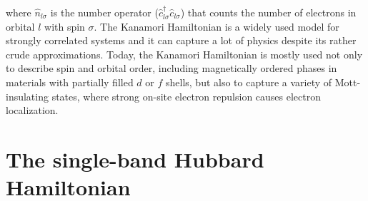 \documentclass[../../main.tex]{subfiles}
\begin{document}
where $\hat n_{l\sigma}$ is the number operator ($\hat c^\dagger_{l\sigma}\hat c_{l\sigma}$) that counts the number of electrons in orbital $l$ with spin $\sigma$. The Kanamori Hamiltonian is a widely used model for strongly correlated systems and it can capture a lot of physics despite its rather crude approximations. Today, the Kanamori Hamiltonian is mostly used not only to describe spin and orbital order, including magnetically ordered phases in materials with partially filled $d$ or $f$ shells, but also to capture a variety of Mott-insulating states, where strong on-site electron repulsion causes electron localization.

\section{The single-band Hubbard Hamiltonian}
\end{document}
